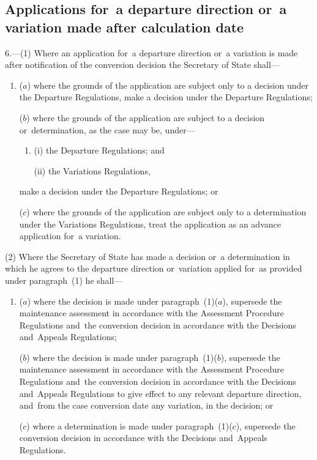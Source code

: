 \documentclass[12pt,a4paper]{article}
\begin{document}
\subsection[6. Applications for~a departure direction or~a variation made after calculation date]{Applications for~a departure direction or~a variation made after calculation date}

6.---(1)  Where an application for~a departure direction or~a variation is made after notification of the conversion decision the Secretary of State shall—
\begin{enumerate}\item[]
($a$) where the grounds of the application are subject only to a decision under the Departure Regulations, make a decision under the Departure Regulations;

($b$) where the grounds of the application are subject to a decision or~determination, as the case may be, under—
\begin{enumerate}\item[]
(i) the Departure Regulations; and

(ii) the Variations Regulations,
\end{enumerate}
make a decision under the Departure Regulations; or

($c$) where the grounds of the application are subject only to a determination under the Variations Regulations, treat the application as an advance application for~a variation.
\end{enumerate}

(2) Where the Secretary of State has made a decision or~a determination in which he agrees to the departure direction or~variation applied for~as provided under paragraph~(1) he shall—
\begin{enumerate}\item[]
($a$) where the decision is made under paragraph~(1)($a$), supersede the maintenance assessment in accordance with the Assessment Procedure Regulations and~the conversion decision in accordance with the Decisions and~Appeals Regulations;

($b$) where the decision is made under paragraph~(1)($b$), supersede the maintenance assessment in accordance with the Assessment Procedure Regulations and~the conversion decision in accordance with the Decisions and~Appeals Regulations to give effect to any relevant departure direction, and~from the case conversion date any variation, in the decision; or

($c$) where a determination is made under paragraph~(1)($c$), supersede the conversion decision in accordance with the Decisions and~Appeals Regulations.
\end{enumerate}
\end{document}
